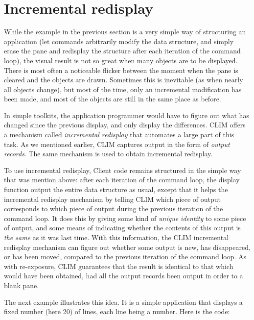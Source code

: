 \section{Incremental redisplay}

While the example in the previous section is a very simple way of
structuring an application (let commands arbitrarily modify the data
structure, and simply erase the pane and redisplay the structure after
each iteration of the command loop), the visual result is not so great
when many objects are to be displayed.  There is most often a noticeable
flicker between the moment when the pane is cleared and the objects are
drawn.  Sometimes this is inevitable (as when nearly all objects
change), but most of the time, only an incremental modification has been
made, and most of the objects are still in the same place as before.

In simple toolkits, the application programmer would have to figure out
what has changed since the previous display, and only display the
differences.  CLIM offers a mechanism called \emph{incremental
redisplay}
that automates a large part of this task.  As we mentioned earlier, CLIM
captures output in the form of \emph{output records}.  The same
mechanism is used to obtain incremental redisplay.

To use incremental redisplay, Client code remains structured in the
simple way that was mention above: after each iteration of the command
loop, the display function output the entire data structure as usual,
except that it helps the incremental redisplay mechanism by telling CLIM
which piece of output corresponds to which piece of output during the
previous iteration of the command loop.  It does this by giving some
kind of \emph{unique identity} to some piece of output, and some means
of indicating whether the contents of this output is \emph{the same} as
it was last time.  With this information, the CLIM incremental redisplay
mechanism can figure out whether some output is new, has disappeared, or
has been moved, compared to the previous iteration of the command loop.
As with re-exposure, CLIM guarantees that the result is identical to
that which would have been obtained, had all the output records been
output in order to a blank pane.

The next example illustrates this idea.  It is a simple application that
displays a fixed number (here 20) of lines, each line being a number.
Here is the code:



